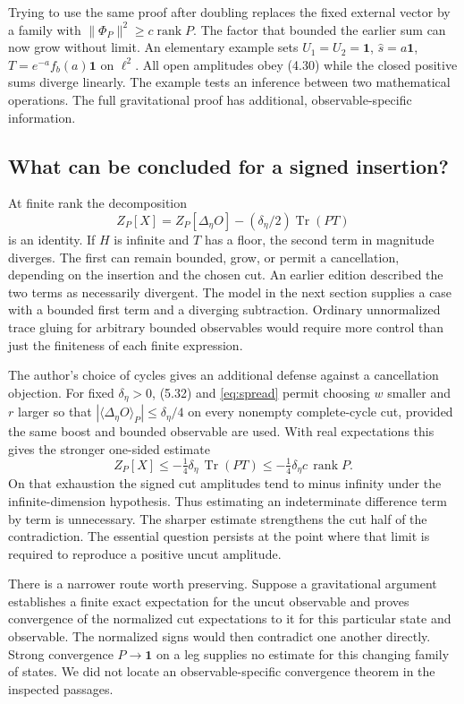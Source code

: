 \documentclass[11pt]{article}
\newcommand{\Tr}{\operatorname{Tr}}
\newcommand{\id}{\mathbf{1}}
\newcommand{\areaop}{\hat s}
\DeclareMathOperator{\rank}{rank}
\begin{document}
Trying to use the same proof after doubling replaces the fixed external vector by a family with $\|\Phi_P\|^2\ge c\rank P$. The factor that bounded the earlier sum can now grow without limit. An elementary example sets $U_1=U_2=\id$, $\areaop=a\id$, $T=e^{-a}f_b(a)\id$ on $\ell^2$. All open amplitudes obey (4.30) while the closed positive sums diverge linearly. The example tests an inference between two mathematical operations. The full gravitational proof has additional, observable-specific information.

\subsection{What can be concluded for a signed insertion?}
At finite rank the decomposition
\[
 Z_P[X]=Z_P[\Delta_\eta O]-(\delta_\eta/2)\Tr(PT)
\]
is an identity. If $H$ is infinite and $T$ has a floor, the second term in magnitude diverges. The first can remain bounded, grow, or permit a cancellation, depending on the insertion and the chosen cut. An earlier edition described the two terms as necessarily divergent. The model in the next section supplies a case with a bounded first term and a diverging subtraction. Ordinary unnormalized trace gluing for arbitrary bounded observables would require more control than just the finiteness of each finite expression.

The author's choice of cycles gives an additional defense against a cancellation objection. For fixed $\delta_\eta>0$, (5.32) and \eqref{eq:spread} permit choosing $w$ smaller and $r$ larger so that $|\langle\Delta_\eta O\rangle_P|\le\delta_\eta/4$ on every nonempty complete-cycle cut, provided the same boost and bounded observable are used. With real expectations this gives the stronger one-sided estimate
\[
 Z_P[X]\le -\tfrac14\delta_\eta\,\Tr(PT)
          \le -\tfrac14\delta_\eta c\,\rank P .
\]
On that exhaustion the signed cut amplitudes tend to minus infinity under the infinite-dimension hypothesis. Thus estimating an indeterminate difference term by term is unnecessary. The sharper estimate strengthens the cut half of the contradiction. The essential question persists at the point where that limit is required to reproduce a positive uncut amplitude.

There is a narrower route worth preserving. Suppose a gravitational argument establishes a finite exact expectation for the uncut observable and proves convergence of the normalized cut expectations to it for this particular state and observable. The normalized signs would then contradict one another directly. Strong convergence $P\to\id$ on a leg supplies no estimate for this changing family of states. We did not locate an observable-specific convergence theorem in the inspected passages.
\end{document}
